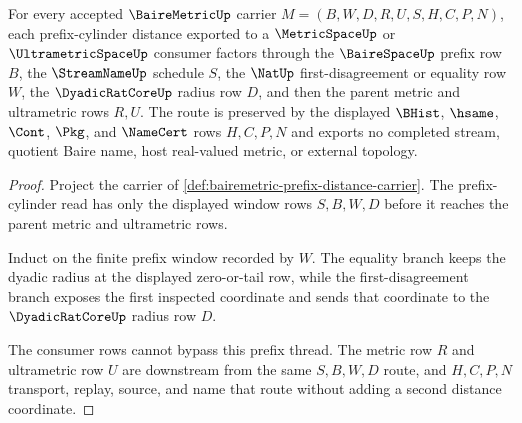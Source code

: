 \begin{theorem}
\label{thm:bairemetric-ultrametric-cylinder-obligation}
For every accepted $\BaireMetricUp$ carrier $M=(B,W,D,R,U,S,H,C,P,N)$, each prefix-cylinder distance exported to a $\MetricSpaceUp$ or $\UltrametricSpaceUp$ consumer factors through the $\BaireSpaceUp$ prefix row $B$, the $\StreamNameUp$ schedule $S$, the $\NatUp$ first-disagreement or equality row $W$, the $\DyadicRatCoreUp$ radius row $D$, and then the parent metric and ultrametric rows $R,U$. The route is preserved by the displayed $\BHist$, $\hsame$, $\Cont$, $\Pkg$, and $\NameCert$ rows $H,C,P,N$ and exports no completed stream, quotient Baire name, host real-valued metric, or external topology.
\end{theorem}
\begin{proof}
Project the carrier of \autoref{def:bairemetric-prefix-distance-carrier}. The prefix-cylinder read has only the displayed window rows $S,B,W,D$ before it reaches the parent metric and ultrametric rows.

Induct on the finite prefix window recorded by $W$. The equality branch keeps the dyadic radius at the displayed zero-or-tail row, while the first-disagreement branch exposes the first inspected coordinate and sends that coordinate to the $\DyadicRatCoreUp$ radius row $D$.

The consumer rows cannot bypass this prefix thread. The metric row $R$ and ultrametric row $U$ are downstream from the same $S,B,W,D$ route, and $H,C,P,N$ transport, replay, source, and name that route without adding a second distance coordinate.
\end{proof}

